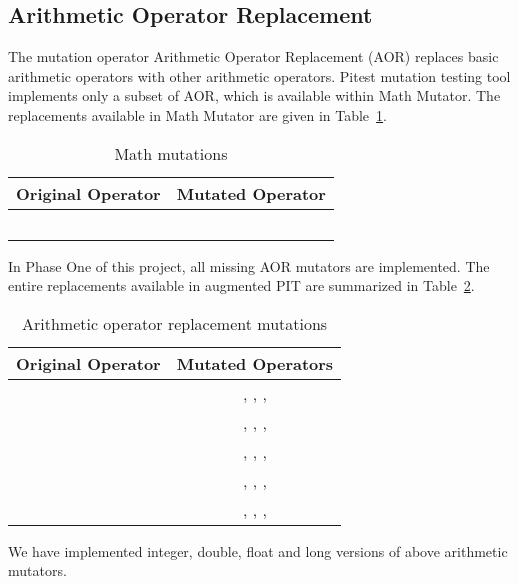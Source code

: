 \subsection{Arithmetic Operator Replacement}
The mutation operator Arithmetic Operator Replacement (AOR) replaces basic arithmetic operators with other arithmetic operators.
Pitest mutation testing tool implements only a subset of AOR, which is available within Math Mutator.
The replacements available in Math Mutator are given in Table~\ref{tab:math:src_ops}.

\begin{table}
  \centering
  \begin{tabular}{c c}
    \toprule
    Original Operator & Mutated Operator \\
    \midrule
    \java{+}          & \java{-}         \\
    \java{-}          & \java{+}         \\
    \java{*}          & \java{/}         \\
    \java{/}          & \java{*}         \\
    \java{\%}         & \java{*}         \\
    \bottomrule
  \end{tabular}
  \caption[Math mutations]{Math mutations}
  \label{tab:math:src_ops}
\end{table}

In Phase One of this project, all missing AOR mutators are implemented.
The entire replacements available in augmented PIT are summarized in Table~\ref{tab:aor:src_ops}.

\begin{table}
  \centering
  \begin{tabular}{c c}
    \toprule
    Original Operator & Mutated Operators                                           \\
    \midrule
    \java{+}          & \phantom{\java{+},} \java{-}, \java{*}, \java{/}, \java{\%} \\
    \java{-}          & \java{+}, \phantom{\java{-},} \java{*}, \java{/}, \java{\%} \\
    \java{*}          & \java{+}, \java{-}, \phantom{\java{*},} \java{/}, \java{\%} \\
    \java{/}          & \java{+}, \java{-}, \java{*}, \phantom{\java{/},} \java{\%} \\
    \java{\%}         & \java{+}, \java{-}, \java{*}, \java{/}\phantom{, \java{\%}} \\
    \bottomrule
  \end{tabular}
  \caption[AOR mutations]{Arithmetic operator replacement mutations}
  \label{tab:aor:src_ops}
\end{table}

We have implemented integer, double, float and long versions of above arithmetic mutators.

